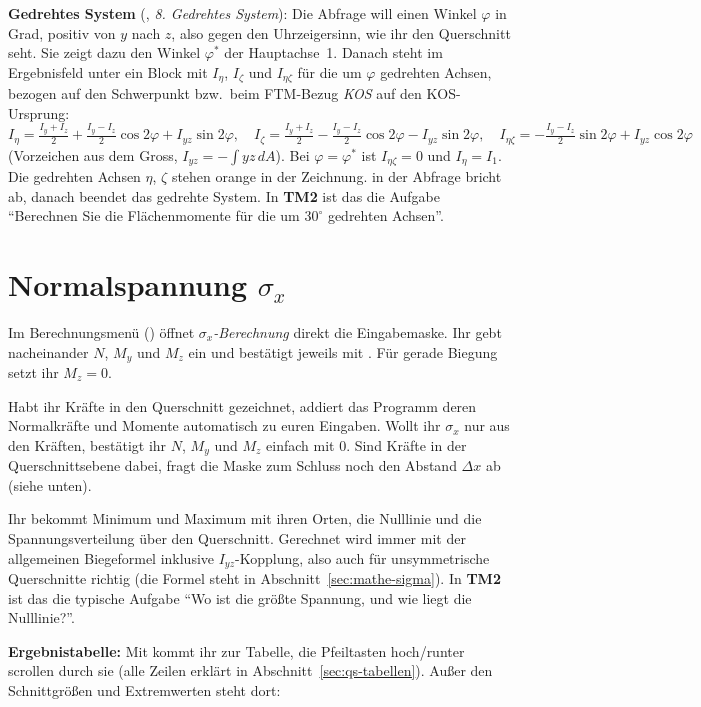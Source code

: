 \textbf{Gedrehtes System} (, \emph{8. Gedrehtes System}): Die Abfrage will einen Winkel
$\varphi$ in Grad, positiv von $y$ nach $z$, also gegen den Uhrzeigersinn, wie ihr den Querschnitt
seht. Sie zeigt dazu den Winkel $\varphi^*$ der Hauptachse~1. Danach steht im Ergebnisfeld unter
 ein Block mit $I_\eta$, $I_\zeta$ und $I_{\eta\zeta}$ für die um $\varphi$ gedrehten
Achsen, bezogen auf den Schwerpunkt bzw.\ beim FTM-Bezug \emph{KOS} auf den KOS-Ursprung:
\[
  I_\eta = \tfrac{I_y + I_z}{2} + \tfrac{I_y - I_z}{2}\cos 2\varphi + I_{yz}\sin 2\varphi, \quad
  I_\zeta = \tfrac{I_y + I_z}{2} - \tfrac{I_y - I_z}{2}\cos 2\varphi - I_{yz}\sin 2\varphi, \quad
  I_{\eta\zeta} = -\tfrac{I_y - I_z}{2}\sin 2\varphi + I_{yz}\cos 2\varphi
\]
(Vorzeichen aus dem Gross, $I_{yz} = -\int yz\,dA$). Bei $\varphi = \varphi^*$ ist
$I_{\eta\zeta} = 0$ und $I_\eta = I_1$. Die gedrehten Achsen $\eta$, $\zeta$ stehen orange in der
Zeichnung.  in der Abfrage bricht ab,  danach beendet das gedrehte System.
In \textbf{TM2} ist das die Aufgabe \enquote{Berechnen Sie die Flächenmomente für die um
$30^\circ$ gedrehten Achsen}.


\section{\texorpdfstring{Normalspannung $\sigma_x$}{Normalspannung sigma-x}}

Im Berechnungsmenü () öffnet \emph{$\sigma_x$-Berechnung} direkt die Eingabemaske. Ihr
gebt nacheinander $N$, $M_y$ und $M_z$ ein und bestätigt jeweils mit . Für gerade
Biegung setzt ihr $M_z = 0$.

Habt ihr Kräfte in den Querschnitt gezeichnet, addiert das Programm deren Normalkräfte und
Momente automatisch zu euren Eingaben. Wollt ihr $\sigma_x$ nur aus den Kräften, bestätigt ihr
$N$, $M_y$ und $M_z$ einfach mit 0. Sind Kräfte in der Querschnittsebene dabei, fragt die Maske
zum Schluss noch den Abstand $\Delta x$ ab (siehe unten).

Ihr bekommt Minimum und Maximum mit ihren Orten, die Nulllinie und die Spannungsverteilung über
den Querschnitt. Gerechnet wird immer mit der allgemeinen Biegeformel inklusive
$I_{yz}$-Kopplung, also auch für unsymmetrische Querschnitte richtig (die Formel steht in
Abschnitt~\ref{sec:mathe-sigma}). In \textbf{TM2} ist das die typische Aufgabe \enquote{Wo ist die
größte Spannung, und wie liegt die Nulllinie?}.

\textbf{Ergebnistabelle:} Mit  kommt ihr zur Tabelle, die Pfeiltasten hoch/runter
scrollen durch sie (alle Zeilen erklärt in Abschnitt~\ref{sec:qs-tabellen}). Außer den
Schnittgrößen und Extremwerten steht dort:


